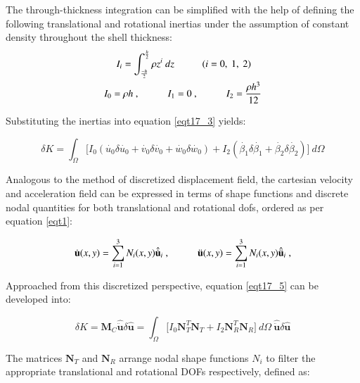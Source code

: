 The through-thickness integration can be simplified with the help of defining the following translational and rotational inertias under the assumption of constant density throughout the shell thickness:
\begin{gather} 
	\begin{aligned}
		&\ \ \ \ \ 
		I_i = \int_{\frac{-h}{2}}^{\frac{h}{2}} \rho 
		z^i
		\ dz
		\hspace{10mm}
		(i = 0,\ 1,\ 2)
		\\
		&I_0 = \rho h\ ,
		\hspace{10mm}
		I_1 = 0\ ,
		\hspace{10mm}
		I_2 = \frac{\rho h^3}{12}
		\label{eqt17_4}
	\end{aligned}
\end{gather}

Substituting the inertias into equation \ref{eqt17_3} yields:

\begin{equation} 
	\delta K = \int_{\Omega} 
	\Big[I_0
	(\dot{u_0} \delta \dot{u_0} 
	+ \dot{v_0} \delta \dot{v_0}
	+ \dot{w_0} \delta \dot{w_0}
	)  
	+
	I_2
	(\dot{\beta_1} \delta \dot{\beta_1} 
	+ \dot{\beta_2} \delta \dot{\beta_2} 
	)  
	\Big]
	\ d\Omega
	\label{eqt17_5}
\end{equation}

Analogous to the method of discretized displacement field, the cartesian velocity and acceleration field can be expressed in terms of shape functions and discrete nodal quantities for both translational and rotational dofs, ordered as per equation \ref{eqt1}:

\begin{equation} 
\dot{\mathbf{u}} (x,y)
=
\sum_{i=1}^{3} N_i (x,y)
\hat{\dot{\mathbf{u}}}_i\ ,
\hspace{10mm}
\ddot{\mathbf{u}} (x,y)
=
\sum_{i=1}^{3} N_i (x,y)
\hat{\ddot{\mathbf{u}}}_i\ ,
\label{eqt17_6}
\end{equation}

Approached from this discretized perspective, equation \ref{eqt17_5} can be developed into:

\begin{equation} 
\delta K = \mathbf{M}_C \hat{\ddot{\mathbf{{u}}}} \delta \hat{\mathbf{u}}
=
\int_{\Omega} 
\Big[I_0
\mathbf{N}_T^T
\mathbf{N}_T
+
I_2
\mathbf{N}_R^T
\mathbf{N}_R
\Big]
\ d\Omega\ 
\hat{\ddot{\mathbf{{u}}}}
\delta \hat{\mathbf{u}}
\label{eqt17_7}
\end{equation}

The matrices $\mathbf{N}_T$ and $\mathbf{N}_R$ arrange nodal shape functions $N_i$ to filter the appropriate translational and rotational DOFs respectively, defined as:

